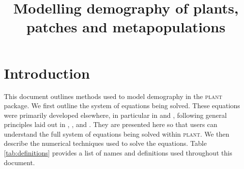 \documentclass[10pt,twoside]{article}
\title{Modelling demography of plants, patches and metapopulations}
\date{}
\newcommand{\plant}{\textsc{plant}}
\begin{document}
\maketitle

\tableofcontents

\section{Introduction}

This document outlines methods used to model demography in the {\plant}
package. We first outline the system of equations being solved. These equations were primarily
developed elsewhere, in particular in \citet{Falster-2011} and
\citet{Falster-2015}, following general principles laid out in
\citet{Deroos-1997}, \citet{Kohyama-1993}, and \citet{Moorcroft-2001}. They are presented here so that
users can understand the full system of equations being solved within {\plant}.
We then describe the numerical techniques used to solve the equations.
Table \ref{tab:definitions} provides a list of names and definitions used
throughout this document.
\end{document}
